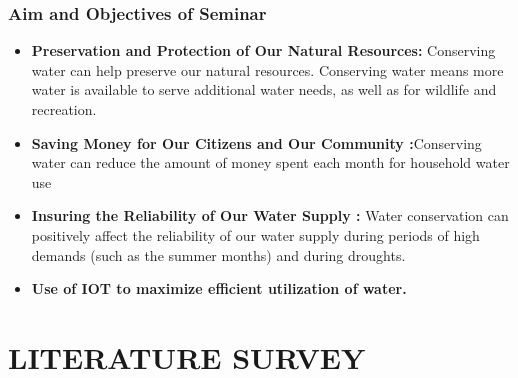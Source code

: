 \documentclass[12pt,times,a4paper]{report}
\begin{document}
{{\begin{normalsize}
\subsection{Aim and Objectives of Seminar}
\begin{itemize}
    \item \textbf{Preservation and Protection of Our Natural Resources:} Conserving water can help preserve our natural resources. Conserving water means more water is available to serve additional water needs, as well as for wildlife and recreation. 
    \item \textbf{Saving Money for Our Citizens and Our Community :}Conserving water can reduce the amount of money spent each month for household water use
 \item\textbf{Insuring the Reliability of Our Water Supply :} Water conservation can positively affect the reliability of our water supply during periods of high demands (such as the summer months) and during droughts. 
\item \textbf{Use of IOT to maximize efficient utilization of water.}
\end{itemize}
\newpage
\chapter{\fontsize{18}{16}\textbf{LITERATURE SURVEY}}


\end{normalsize}}}
\end{document}
